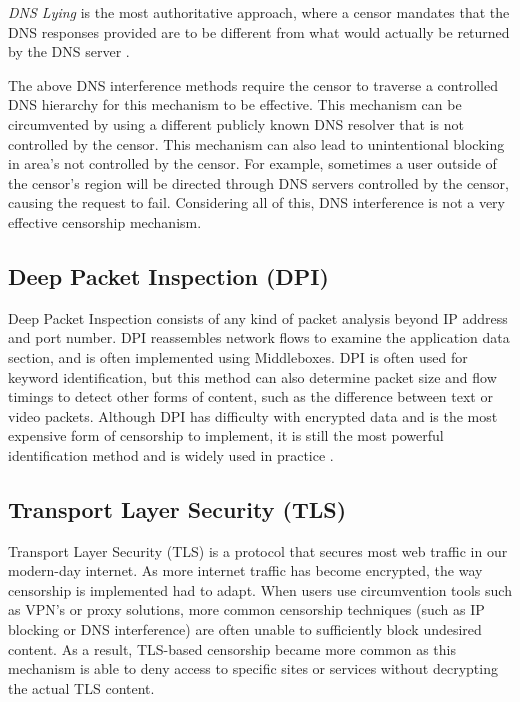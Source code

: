 \textit{DNS Lying} is the most authoritative approach, where a censor mandates that the DNS responses provided are to be different from what would actually be returned by the DNS server \cite{rfc9505}.

The above DNS interference methods require the censor to traverse a controlled DNS hierarchy for this mechanism to be effective. This mechanism can be circumvented by using a different publicly known DNS resolver that is not controlled by the censor. This mechanism can also lead to unintentional blocking in area's not controlled by the censor. For example, sometimes a user outside of the censor's region will be directed through DNS servers controlled by the censor, causing the request to fail. Considering all of this, DNS interference is not a very effective censorship mechanism.

\subsection{Deep Packet Inspection (DPI)}

Deep Packet Inspection consists of any kind of packet analysis beyond IP address and port number. DPI reassembles network flows to examine the application data section, and is often implemented using Middleboxes. DPI is often used for keyword identification, but this method can also determine packet size and flow timings to detect other forms of content, such as the difference between text or video packets. Although DPI has difficulty with encrypted data and is the most expensive form of censorship to implement, it is still the most powerful identification method and is widely used in practice \cite{rfc9505}.

\subsection{Transport Layer Security (TLS)}

Transport Layer Security (TLS) is a protocol that secures most web traffic in our modern-day internet. As more internet traffic has become encrypted, the way censorship is implemented had to adapt. When users use circumvention tools such as VPN's or proxy solutions, more common censorship techniques (such as IP blocking or DNS interference) are often unable to sufficiently block undesired content. As a result, TLS-based censorship became more common as this mechanism is able to deny access to specific sites or services without decrypting the actual TLS content. 

